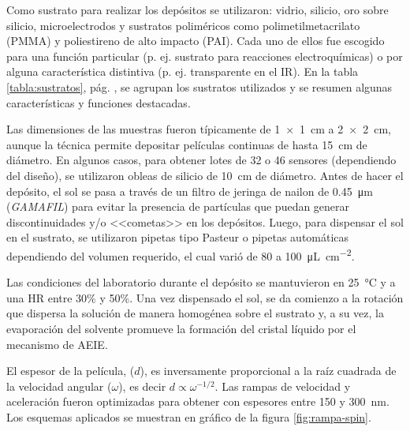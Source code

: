 			Como sustrato para realizar los depósitos se utilizaron: vidrio, silicio, oro sobre silicio, microelectrodos y sustratos poliméricos como  polimetilmetacrilato (PMMA) y poliestireno de alto impacto (PAI). Cada uno de ellos fue escogido para una función particular (p. ej. sustrato para reacciones electroquímicas) o por alguna característica distintiva (p. ej. transparente en el IR). En la tabla \ref{tabla:sustratos}, pág. \pageref{tabla:sustratos}, se agrupan los sustratos utilizados y se resumen algunas características y funciones destacadas.

			Las dimensiones de las muestras fueron típicamente de \SI{1x1}{\cm} a \linebreak \SI{2x2}{\cm}, aunque la técnica permite depositar películas continuas de hasta \SI{15}{cm} de diámetro. En algunos casos, para obtener lotes de 32 o 46 sensores (dependiendo del diseño), se utilizaron obleas de silicio de \SI{10}{\cm} de diámetro. Antes de hacer el depósito, el sol se pasa a través de un filtro de jeringa de nailon de \SI{0.45}{\um} (\textit{GAMAFIL}) para evitar la presencia de partículas que puedan generar discontinuidades y/o <<cometas>> en los depósitos\cite{Franssila2004}. Luego, para dispensar el sol en el sustrato, se utilizaron pipetas tipo Pasteur o pipetas automáticas dependiendo del volumen requerido, el cual varió de 80 a \SI{100}{\uL.\cm^{-2}}. 

			Las condiciones del laboratorio durante el depósito se mantuvieron en \SI{25}{\celsius} y a una HR entre 30\% y 50\%. Una vez dispensado el sol, se da comienzo a la rotación que dispersa la solución de manera homogénea sobre el sustrato y, a su vez, la evaporación del solvente promueve la formación del cristal líquido por el mecanismo de AEIE\cite{Brinker1999}.


			\pagebreak El espesor de la película, ($d$), es inversamente proporcional a la raíz cuadrada de la velocidad angular ($\omega$), es decir $d\propto \omega ^{-1/2}$. Las rampas de velocidad y aceleración fueron optimizadas para obtener \pdm\space con espesores entre 150 y \SI{300}{\nm}\cite{Meyerhofer1978,Hall1998,Brinker1990}. Los esquemas aplicados se muestran en gráfico de la figura \ref{fig:rampa-spin}. 
			
